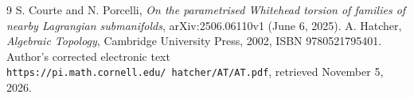 \documentclass[11pt]{article}
\begin{document}
\begin{thebibliography}{9}
S. Courte and N. Porcelli,
\emph{On the parametrised Whitehead torsion of families of nearby
Lagrangian submanifolds}, arXiv:2506.06110v1 (June 6, 2025).
A. Hatcher, \emph{Algebraic Topology}, Cambridge University Press, 2002,
ISBN 9780521795401. Author's corrected electronic text
\texttt{https://pi.math.cornell.edu/\string~hatcher/AT/AT.pdf},
retrieved November 5, 2026.
\end{thebibliography}
\end{document}
